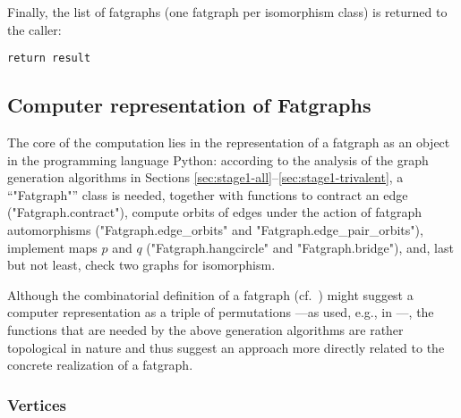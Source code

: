Finally, the list of fatgraphs (one fatgraph per isomorphism class) is
returned to the caller:
\begin{lstlisting}[name=MgnTrivalentGraphs,firstnumber=50]
    return result
\end{lstlisting}


\subsection{Computer representation of Fatgraphs}
\label{sec:stage1-fatgraphs}

The core of the computation lies in the representation of a fatgraph
as an object in the programming language Python: according to the
analysis of the graph generation algorithms in
Sections \ref{sec:stage1-all}--\ref{sec:stage1-trivalent}, a
``"Fatgraph"'' class is needed, together with functions to contract an
edge ("Fatgraph.contract"), compute orbits of edges under the action
of fatgraph automorphisms ("Fatgraph.edge_orbits" and
"Fatgraph.edge_pair_orbits"), implement maps $p$ and $q$
("Fatgraph.hangcircle" and "Fatgraph.bridge"), and, last but not
least, check two graphs for isomorphism.

Although the combinatorial definition of a fatgraph
(cf.~) might suggest a computer representation as
a triple of permutations ---as used, e.g., in \cite[Section
2.4]{arXiv:0902.1025}---, the functions that are needed by the above
generation algorithms are rather topological in nature and thus
suggest an approach more directly related to the concrete realization
of a fatgraph.

\subsubsection{Vertices}
\label{sec:vertices}

